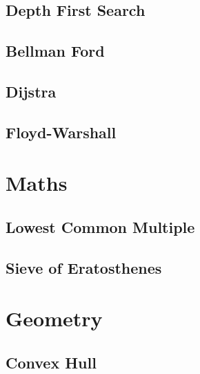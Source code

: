 \documentclass[10pt,a4paper]{article}
\begin{document}
\begin{landscape}
\begin{multicols}{2}


\subsection{Depth First Search}



\subsection{Bellman Ford}



\subsection{Dijstra}



\subsection{Floyd-Warshall}



\section{Maths}

\subsection{Lowest Common Multiple}



\subsection{Sieve of Eratosthenes}



\section{Geometry}

\subsection{Convex Hull}


\end{multicols}
\end{landscape}
\end{document}

